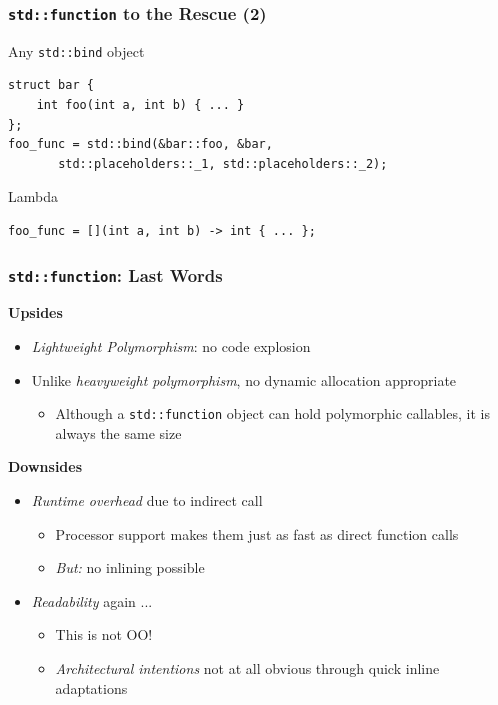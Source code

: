 \begin{frame}[fragile]
  \frametitle{\texttt{std::function} to the Rescue (2)}

  \begin{block}{Any \texttt{std::bind} object}
\begin{verbatim}
struct bar {
    int foo(int a, int b) { ... }
};
foo_func = std::bind(&bar::foo, &bar,
       std::placeholders::_1, std::placeholders::_2);
\end{verbatim}
  \end{block}

  \begin{block}{Lambda}
\begin{verbatim}
foo_func = [](int a, int b) -> int { ... };
\end{verbatim}
  \end{block}
  
\end{frame}

\begin{frame}[fragile]
  \frametitle{\texttt{std::function}: Last Words}

  \textbf{Upsides}

  \begin{itemize}
  \item \textit{Lightweight Polymorphism}: no code explosion
  \item Unlike \textit{heavyweight polymorphism}, no dynamic
    allocation appropriate
    \begin{itemize}
    \item Although a \texttt{std::function} object can hold
      polymorphic callables, it is always the same size
    \end{itemize}
  \end{itemize}

  \textbf{Downsides}

  \begin{itemize}
  \item \textit{Runtime overhead} due to indirect call
    \begin{itemize}
    \item Processor support makes them just as fast as direct function
      calls
    \item \textit{But:} no inlining possible
    \end{itemize}
  \item \textit{Readability} again ...
    \begin{itemize}
    \item This is not OO!
    \item \textit{Architectural intentions} not at all obvious through
      quick inline adaptations
    \end{itemize}
  \end{itemize}
  
\end{frame}
